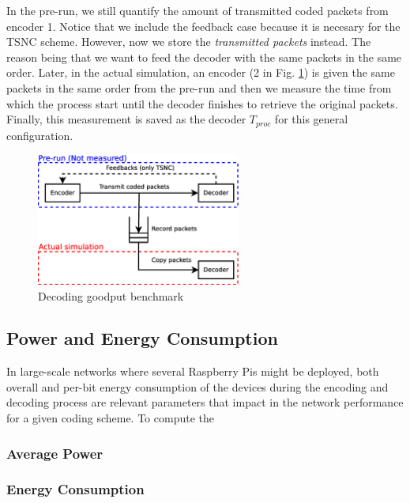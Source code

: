 In the pre-run, we still quantify the amount of transmitted coded
packets from encoder 1. Notice that we include the feedback case because
it is necesary for the \ac{TSNC} scheme. However, now we store
the \textit{transmitted packets} instead. The reason being
that we want to feed the decoder with the same packets in the same
order. Later, in the actual simulation, an encoder (2 in Fig.
\ref{fig:dec_goodput_benchmark}) is given the same packets in the same
order from the pre-run and then we measure the time from which the
process start until the decoder finishes to retrieve the original
packets. Finally, this measurement is saved as the decoder $T_{proc}$
for this general configuration.

\begin{figure}[ht!]
\centering
\includegraphics[width=0.6\textwidth]{images/measure_decoder.eps}
\caption{Decoding goodput benchmark}
\label{fig:dec_goodput_benchmark}
\end{figure}

\subsection{Power and Energy Consumption}
In large-scale networks where several Raspberry Pis might be deployed,
both overall and per-bit energy consumption of the devices during the
encoding and decoding process are relevant parameters that impact in the
network performance for a given coding scheme. To compute the

\subsubsection{Average Power}
\subsubsection{Energy Consumption}
